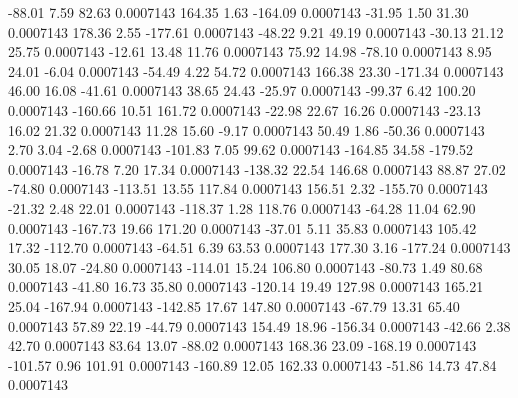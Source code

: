       -88.01        7.59       82.63     0.0007143
      164.35        1.63     -164.09     0.0007143
      -31.95        1.50       31.30     0.0007143
      178.36        2.55     -177.61     0.0007143
      -48.22        9.21       49.19     0.0007143
      -30.13       21.12       25.75     0.0007143
      -12.61       13.48       11.76     0.0007143
       75.92       14.98      -78.10     0.0007143
        8.95       24.01       -6.04     0.0007143
      -54.49        4.22       54.72     0.0007143
      166.38       23.30     -171.34     0.0007143
       46.00       16.08      -41.61     0.0007143
       38.65       24.43      -25.97     0.0007143
      -99.37        6.42      100.20     0.0007143
     -160.66       10.51      161.72     0.0007143
      -22.98       22.67       16.26     0.0007143
      -23.13       16.02       21.32     0.0007143
       11.28       15.60       -9.17     0.0007143
       50.49        1.86      -50.36     0.0007143
        2.70        3.04       -2.68     0.0007143
     -101.83        7.05       99.62     0.0007143
     -164.85       34.58     -179.52     0.0007143
      -16.78        7.20       17.34     0.0007143
     -138.32       22.54      146.68     0.0007143
       88.87       27.02      -74.80     0.0007143
     -113.51       13.55      117.84     0.0007143
      156.51        2.32     -155.70     0.0007143
      -21.32        2.48       22.01     0.0007143
     -118.37        1.28      118.76     0.0007143
      -64.28       11.04       62.90     0.0007143
     -167.73       19.66      171.20     0.0007143
      -37.01        5.11       35.83     0.0007143
      105.42       17.32     -112.70     0.0007143
      -64.51        6.39       63.53     0.0007143
      177.30        3.16     -177.24     0.0007143
       30.05       18.07      -24.80     0.0007143
     -114.01       15.24      106.80     0.0007143
      -80.73        1.49       80.68     0.0007143
      -41.80       16.73       35.80     0.0007143
     -120.14       19.49      127.98     0.0007143
      165.21       25.04     -167.94     0.0007143
     -142.85       17.67      147.80     0.0007143
      -67.79       13.31       65.40     0.0007143
       57.89       22.19      -44.79     0.0007143
      154.49       18.96     -156.34     0.0007143
      -42.66        2.38       42.70     0.0007143
       83.64       13.07      -88.02     0.0007143
      168.36       23.09     -168.19     0.0007143
     -101.57        0.96      101.91     0.0007143
     -160.89       12.05      162.33     0.0007143
      -51.86       14.73       47.84     0.0007143
